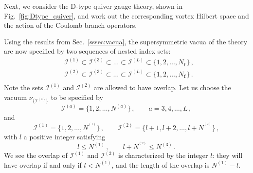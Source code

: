 \documentclass[12pt,a4paper]{article}
\newcounter{subsubsubsection}[subsubsection]
\renewcommand{\(}{\left(}
\renewcommand{\)}{\right)}
\renewcommand{\(}{\left(}
\renewcommand{\)}{\right)}
\begin{document}
\label{ssssec:Dtype_vortex}
Next, we consider the D-type quiver gauge theory, shown in Fig.~\ref{fig:Dtype_quiver}, and work out the corresponding vortex Hilbert space and the action of the Coulomb branch operators.

Using the results from Sec.~\ref{sssec:vacua}, the supersymmetric vacua of the theory are now specified by two sequences of nested index sets:
\begin{equation}
\begin{aligned}
&\mathcal{I}^{(1)}\subset\mathcal{I}^{(3)}\subset \dots\subset \mathcal{I}^{(L)}\subset\{1,2,\dots,N_{\mathtt{f}}\}\,,\\
&\mathcal{I}^{(2)}\subset\mathcal{I}^{(3)}\subset \dots\subset \mathcal{I}^{(L)}\subset\{1,2,\dots,N_{\mathtt{f}}\}\,.\\
\end{aligned}
\end{equation}
Note the sets $\mathcal{I}^{(1)}$ and $\mathcal{I}^{(2)}$ are allowed to have overlap.
Let us choose the vacuum $\nu_{\{\mathcal{I}^{(a)}\}}$ to be specified by
\begin{equation}\label{eq:D_vac1}
\mathcal{I}^{(a)}=\{1,2,\dots,N^{(a)}\}\,,\qquad a=3,4,\dots,L\,,
\end{equation}
and
\begin{equation}\label{eq:D_vac2}
    \mathcal{I}^{(1)}=\{1,2,\dots,N^{^{(1)}}\}\,,\qquad \mathcal{I}^{(2)}=\{l+1,l+2,\dots,l+N^{^{(2)}}\}\,,
\end{equation}
with $l$ a positive integer satisfying 
\begin{equation}
l\leq N^{(1)}\,,\qquad l+N^{^{(2)}}\leq N^{(3)}\,.
\end{equation}
We see the overlap of $\mathcal{I}^{(1)}$ and $\mathcal{I}^{(2)}$ is characterized by the integer $l$: they will have overlap if and only if $l<N^{(1)}$, and the length of the overlap is $N^{(1)}-l$.
\end{document}
